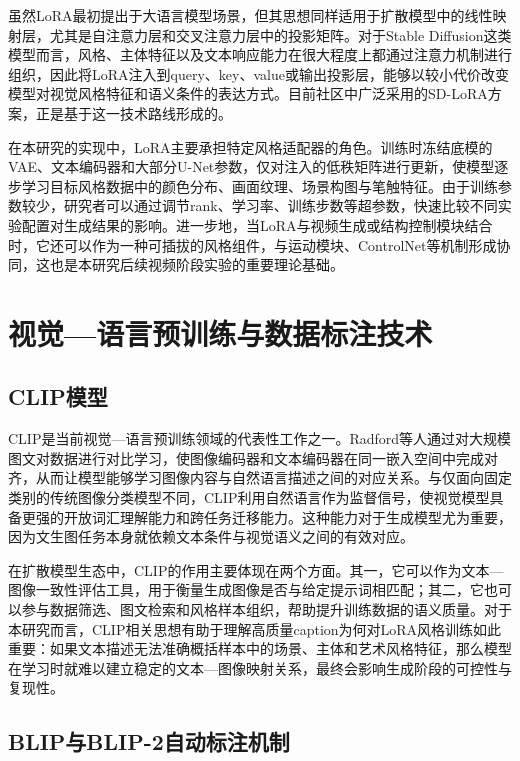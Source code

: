 虽然LoRA最初提出于大语言模型场景，但其思想同样适用于扩散模型中的线性映射层，尤其是自注意力层和交叉注意力层中的投影矩阵。对于Stable Diffusion这类模型而言，风格、主体特征以及文本响应能力在很大程度上都通过注意力机制进行组织，因此将LoRA注入到query、key、value或输出投影层，能够以较小代价改变模型对视觉风格特征和语义条件的表达方式。目前社区中广泛采用的SD-LoRA方案\cite{ref3,ref4}，正是基于这一技术路线形成的。

在本研究的实现中，LoRA主要承担特定风格适配器的角色。训练时冻结底模的VAE、文本编码器和大部分U-Net参数，仅对注入的低秩矩阵进行更新，使模型逐步学习目标风格数据中的颜色分布、画面纹理、场景构图与笔触特征。由于训练参数较少，研究者可以通过调节rank、学习率、训练步数等超参数，快速比较不同实验配置对生成结果的影响。进一步地，当LoRA与视频生成或结构控制模块结合时，它还可以作为一种可插拔的风格组件，与运动模块、ControlNet等机制形成协同，这也是本研究后续视频阶段实验的重要理论基础。

\section{视觉—语言预训练与数据标注技术}

\subsection{CLIP模型}

CLIP\cite{ref23}是当前视觉—语言预训练领域的代表性工作之一。Radford等人通过对大规模图文对数据进行对比学习，使图像编码器和文本编码器在同一嵌入空间中完成对齐，从而让模型能够学习图像内容与自然语言描述之间的对应关系。与仅面向固定类别的传统图像分类模型不同，CLIP利用自然语言作为监督信号，使视觉模型具备更强的开放词汇理解能力和跨任务迁移能力。这种能力对于生成模型尤为重要，因为文生图任务本身就依赖文本条件与视觉语义之间的有效对应。

在扩散模型生态中，CLIP的作用主要体现在两个方面。其一，它可以作为文本—图像一致性评估工具，用于衡量生成图像是否与给定提示词相匹配；其二，它也可以参与数据筛选、图文检索和风格样本组织，帮助提升训练数据的语义质量\cite{ref23}。对于本研究而言，CLIP相关思想有助于理解高质量caption为何对LoRA风格训练如此重要：如果文本描述无法准确概括样本中的场景、主体和艺术风格特征，那么模型在学习时就难以建立稳定的文本—图像映射关系，最终会影响生成阶段的可控性与复现性。

\subsection{BLIP与BLIP-2自动标注机制}

